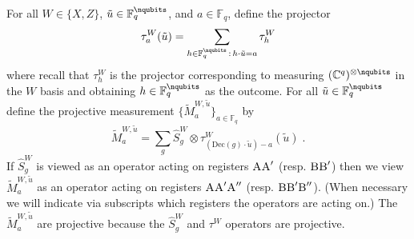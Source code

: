 \documentclass[11pt]{article}
\theoremstyle{definition}
\newcommand{\C}{\ensuremath{\mathbb{C}}}
\newcommand{\F}{\ensuremath{\mathbb{F}}}
\newcommand{\labelstyle}[1]{\ensuremath{\textsc{#1}}\xspace}
\newcommand{\alice}{\labelstyle{A}}
\newcommand{\bob}{\labelstyle{B}}
\newcommand{\coded}{\mathrm{Dec}}
\begin{document}
For all $W \in \{X, Z\}$, $\tilde{u} \in \F_q^{\nqubits}$, and $a \in \F_q$, define the projector
\begin{equation}\label{eq:def-tauwu}
 \tau^{W}_{a}(\tilde{u}) = \sum_{h \in \F_q^{\nqubits} \,:\, h \cdot \tilde{u} = a} \tau^W_{h}
\end{equation}
where recall that $\tau^W_h$ is the projector corresponding to measuring $(\C^q)^{\otimes \nqubits}$ in the $W$ basis and obtaining $h \in \F_q^\nqubits$ as the outcome. For all $\tilde{u} \in \F_q^\nqubits$ define the projective measurement $\{ \tilde{M}^{W,\tilde{u}}_a \}_{a \in \F_q}$ by 
	\begin{equation}
	\label{eq:tilde_M}
	\tilde{M}^{W,\tilde{u}}_a =  \sum_{g} \hat{S}^W_g \otimes \tau_{(\coded(g) \cdot \tilde{u}) - a}^W(\tilde{u})\;.
	\end{equation}
	If $\hat{S}^W_g$ is viewed as an operator acting on registers $\alice \alice'$ (resp. $\bob \bob'$) then we view $\tilde{M}^{W,\tilde{u}}_a$ as an operator acting on registers $\alice \alice' \alice''$ (resp. $\bob \bob' \bob''$). (When necessary we will indicate via subscripts which registers the operators are acting on.)
The $\tilde{M}^{W,\tilde{u}}_a$ are projective because the $\hat{S}^W_g$ and $\tau^W$ operators are projective.
\end{document}

